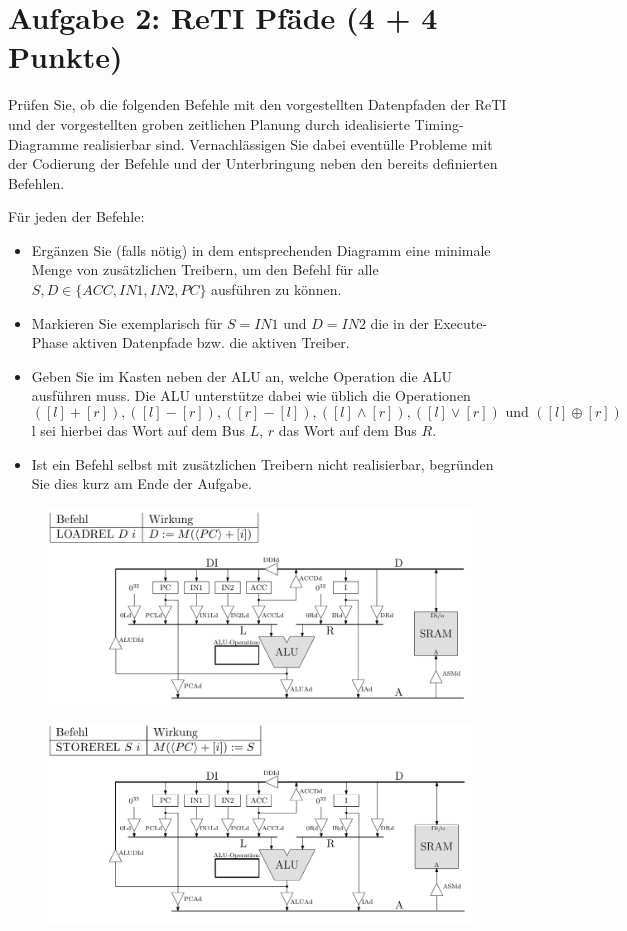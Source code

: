 \documentclass{scrartcl}[9pt, a4paper]
\begin{document}
\section*{Aufgabe 2: ReTI Pfäde (4 + 4 Punkte)}

Prüfen Sie, ob die folgenden Befehle mit den vorgestellten Datenpfaden der ReTI und der vorgestellten groben zeitlichen Planung durch idealisierte Timing-Diagramme realisierbar sind. Vernachlässigen Sie dabei eventülle Probleme mit der Codierung der Befehle und der Unterbringung neben den bereits definierten Befehlen.

Für jeden der Befehle:

\begin{itemize}
	\item  Ergänzen Sie (falls nötig) in dem entsprechenden Diagramm eine minimale Menge von zusätzlichen Treibern, um den Befehl für alle $S, D \in \{ ACC, IN1, IN2, PC \}$ ausführen zu können.
	\item  Markieren Sie exemplarisch für $S = IN1$ und $D = IN2$ die in der Execute-Phase aktiven Datenpfade bzw. die aktiven Treiber.
	\item  Geben Sie im Kasten neben der ALU an, welche Operation die ALU ausführen muss. Die ALU unterstütze dabei wie üblich die Operationen $$([l] + [r]), ([l] - [r]), ([r] - [l]), ([l] \wedge [r]), ([l] \vee [r]) \text{ und } ([l] \oplus [r])$$ l sei hierbei das Wort auf dem Bus $L$, $r$ das Wort auf dem Bus $R$.
	\item Ist ein Befehl selbst mit zusätzlichen Treibern nicht realisierbar, begründen Sie dies kurz am Ende der Aufgabe.
\end{itemize}

\begin{figure}[h]
	\centering
	\includegraphics[width=.9\textwidth]{figs/loadrel}
\end{figure}

\begin{figure}[h]
	\centering
	\includegraphics[width=.9\textwidth]{figs/storerel}
\end{figure}
\end{document}
